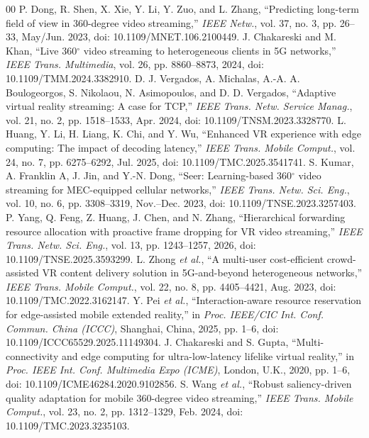 \documentclass[conference]{IEEEtran}
\begin{document}
\begin{thebibliography}{00}
 P. Dong, R. Shen, X. Xie, Y. Li, Y. Zuo, and L. Zhang, ``Predicting long-term field of view in 360-degree video streaming,'' \textit{IEEE Netw.}, vol. 37, no. 3, pp. 26--33, May/Jun. 2023, doi: 10.1109/MNET.106.2100449.
 J. Chakareski and M. Khan, ``Live 360$^\circ$ video streaming to heterogeneous clients in 5G networks,'' \textit{IEEE Trans. Multimedia}, vol. 26, pp. 8860--8873, 2024, doi: 10.1109/TMM.2024.3382910.
 D. J. Vergados, A. Michalas, A.-A. A. Boulogeorgos, S. Nikolaou, N. Asimopoulos, and D. D. Vergados, ``Adaptive virtual reality streaming: A case for TCP,'' \textit{IEEE Trans. Netw. Service Manag.}, vol. 21, no. 2, pp. 1518--1533, Apr. 2024, doi: 10.1109/TNSM.2023.3328770.
 L. Huang, Y. Li, H. Liang, K. Chi, and Y. Wu, ``Enhanced VR experience with edge computing: The impact of decoding latency,'' \textit{IEEE Trans. Mobile Comput.}, vol. 24, no. 7, pp. 6275--6292, Jul. 2025, doi: 10.1109/TMC.2025.3541741.
 S. Kumar, A. Franklin A, J. Jin, and Y.-N. Dong, ``Seer: Learning-based 360$^\circ$ video streaming for MEC-equipped cellular networks,'' \textit{IEEE Trans. Netw. Sci. Eng.}, vol. 10, no. 6, pp. 3308--3319, Nov.--Dec. 2023, doi: 10.1109/TNSE.2023.3257403.
 P. Yang, Q. Feng, Z. Huang, J. Chen, and N. Zhang, ``Hierarchical forwarding resource allocation with proactive frame dropping for VR video streaming,'' \textit{IEEE Trans. Netw. Sci. Eng.}, vol. 13, pp. 1243--1257, 2026, doi: 10.1109/TNSE.2025.3593299.
 L. Zhong \textit{et al.}, ``A multi-user cost-efficient crowd-assisted VR content delivery solution in 5G-and-beyond heterogeneous networks,'' \textit{IEEE Trans. Mobile Comput.}, vol. 22, no. 8, pp. 4405--4421, Aug. 2023, doi: 10.1109/TMC.2022.3162147.
 Y. Pei \textit{et al.}, ``Interaction-aware resource reservation for edge-assisted mobile extended reality,'' in \textit{Proc. IEEE/CIC Int. Conf. Commun. China (ICCC)}, Shanghai, China, 2025, pp. 1--6, doi: 10.1109/ICCC65529.2025.11149304.
 J. Chakareski and S. Gupta, ``Multi-connectivity and edge computing for ultra-low-latency lifelike virtual reality,'' in \textit{Proc. IEEE Int. Conf. Multimedia Expo (ICME)}, London, U.K., 2020, pp. 1--6, doi: 10.1109/ICME46284.2020.9102856.
 S. Wang \textit{et al.}, ``Robust saliency-driven quality adaptation for mobile 360-degree video streaming,'' \textit{IEEE Trans. Mobile Comput.}, vol. 23, no. 2, pp. 1312--1329, Feb. 2024, doi: 10.1109/TMC.2023.3235103.

\end{thebibliography}
\end{document}

